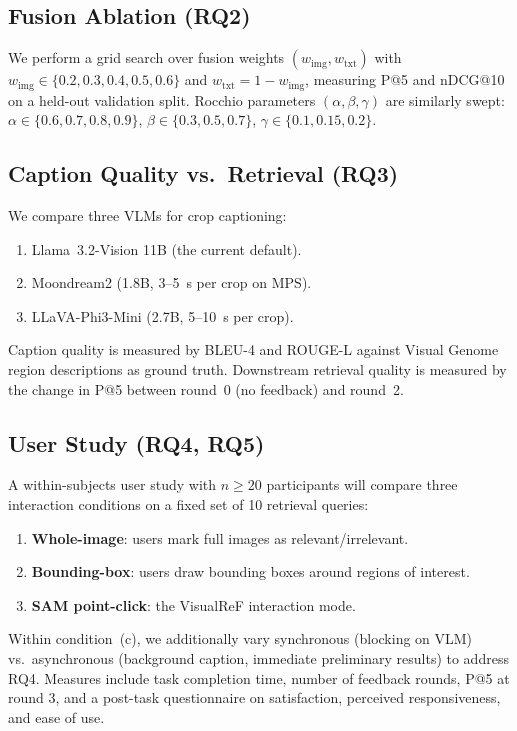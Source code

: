 \documentclass[12pt,a4paper]{article}
\begin{document}
\subsection{Fusion Ablation (RQ2)}

We perform a grid search over fusion weights $(w_{\text{img}}, w_{\text{txt}})$
with $w_{\text{img}} \in \{0.2, 0.3, 0.4, 0.5, 0.6\}$ and $w_{\text{txt}} =
1 - w_{\text{img}}$, measuring P@5 and nDCG@10 on a held-out validation
split. Rocchio parameters $(\alpha, \beta, \gamma)$ are similarly swept:
$\alpha \in \{0.6, 0.7, 0.8, 0.9\}$, $\beta \in \{0.3, 0.5, 0.7\}$,
$\gamma \in \{0.1, 0.15, 0.2\}$.

\subsection{Caption Quality vs.\ Retrieval (RQ3)}

We compare three VLMs for crop captioning:
\begin{enumerate}[leftmargin=1.5em,noitemsep]
  \item Llama~3.2-Vision 11B (the current default).
  \item Moondream2 (1.8B, 3--5~s per crop on MPS).
  \item LLaVA-Phi3-Mini (2.7B, 5--10~s per crop).
\end{enumerate}
Caption quality is measured by BLEU-4 and ROUGE-L against Visual Genome
region descriptions as ground truth. Downstream retrieval quality is measured
by the change in P@5 between round~0 (no feedback) and round~2.

\subsection{User Study (RQ4, RQ5)}

A within-subjects user study with $n \geq 20$ participants will compare three
interaction conditions on a fixed set of 10 retrieval queries:
\begin{enumerate}[leftmargin=1.5em,noitemsep]
  \item \textbf{Whole-image}: users mark full images as relevant/irrelevant.
  \item \textbf{Bounding-box}: users draw bounding boxes around regions of
        interest.
  \item \textbf{SAM point-click}: the VisualReF interaction mode.
\end{enumerate}
Within condition~(c), we additionally vary synchronous (blocking on VLM)
vs.\ asynchronous (background caption, immediate preliminary results) to
address RQ4. Measures include task completion time, number of feedback
rounds, P@5 at round 3, and a post-task questionnaire on satisfaction,
perceived responsiveness, and ease of use.
\end{document}
